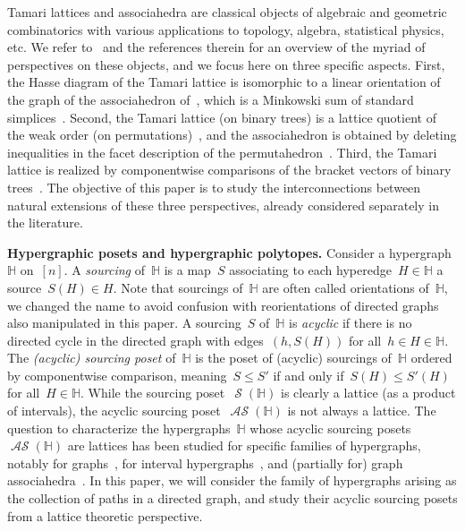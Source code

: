 \documentclass{amsart}
\theoremstyle{definition}
\newcommand{\para}[1]{\bigskip\noindent\textbf{#1}} %
\newcommand{\darkblue}{\color{darkblue}} %
\newcommand{\defn}[1]{\textsl{\darkblue #1}} %
\DeclareMathOperator{\Sour}{\mathcal{S}}  %
\DeclareMathOperator{\ASour}{\mathcal{AS}}  %
\newcommand{\HH}{\mathbb H}  %
\begin{document}
Tamari lattices and associahedra are classical objects of algebraic and geometric combinatorics with various applications to topology, algebra, statistical physics, etc.
We refer to~\cite{TamariFestschrift, CeballosSantosZiegler, PilaudSantosZiegler} and the references therein for an overview of the myriad of  perspectives on these objects, and we focus here on three specific aspects.
First, the Hasse diagram of the Tamari lattice is isomorphic to a linear orientation of the graph of the associahedron of~\cite{ShniderSternberg, Loday}, which is a Minkowski sum of standard simplices~\cite{Postnikov}. 
Second, the Tamari lattice (on binary trees) is a lattice quotient of the weak order (on permutations)~\cite{Tonks, Reading-latticeCongruences}, and the associahedron is obtained by deleting inequalities in the facet description of the permutahedron~\cite{ShniderSternberg, Loday}.
Third, the Tamari lattice is realized by componentwise comparisons of the bracket vectors of binary trees~\cite{HuangTamari}.
The objective of this paper is to study the interconnections between natural extensions of these three perspectives, already considered separately in the literature.


\para{Hypergraphic posets and hypergraphic polytopes.}
Consider a hypergraph~$\HH$ on~$[n]$.
A \defn{sourcing} of~$\HH$ is a map~$S$ associating to each hyperedge~$H \in \HH$ a source~$S(H) \in H$.
Note that sourcings of~$\HH$ are often called orientations of~$\HH$, we changed the name to avoid confusion with reorientations of directed graphs also manipulated in this paper.
A sourcing~$S$ of~$\HH$ is \defn{acyclic} if there is no directed cycle in the directed graph with edges~$(h,S(H))$ for all~$h \in H \in \HH$.
The \defn{(acyclic) sourcing poset} of~$\HH$ is the poset of (acyclic) sourcings of~$\HH$ ordered by componentwise comparison, meaning~$S \le S'$ if and only if~$S(H) \le S'(H)$ for all~$H \in \HH$.
While the sourcing poset~$\Sour(\HH)$ is clearly a lattice (as a product of intervals), the acyclic sourcing poset~$\ASour(\HH)$ is not always a lattice.
The question to characterize the hypergraphs~$\HH$ whose acyclic sourcing posets~$\ASour(\HH)$ are lattices has been studied for specific families of hypergraphs, notably for graphs~\cite{Pilaud-acyclicReorientationLattices}, for interval hypergraphs~\cite{BergeronPilaud}, and (partially for) graph associahedra~\cite{BarnardMcConville}.
In this paper, we will consider the family of hypergraphs arising as the collection of paths in a directed graph, and study their acyclic sourcing posets from a lattice theoretic perspective.
\end{document}
